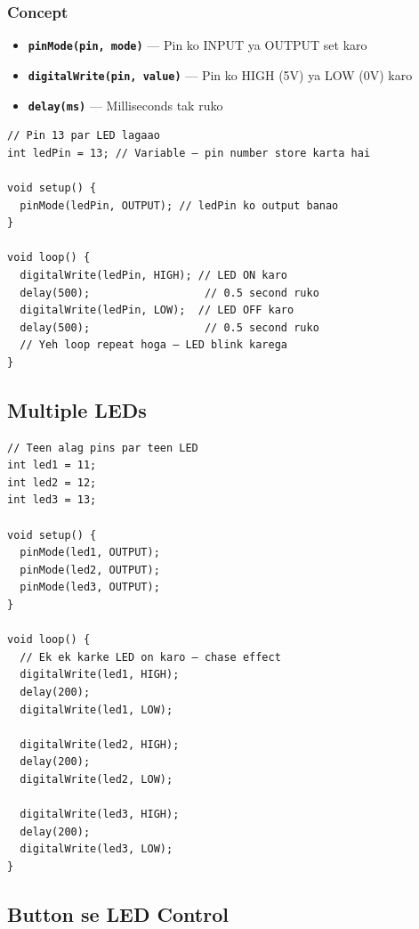 \documentclass[12pt,a4paper]{article}
\newcommand{\keyword}[1]{\textcolor{keywordColor}{\texttt{\textbf{#1}}}}
\begin{document}
\subsubsection{Concept}
\begin{itemize}
  \item \keyword{pinMode(pin, mode)} — Pin ko INPUT ya OUTPUT set karo
  \item \keyword{digitalWrite(pin, value)} — Pin ko HIGH (5V) ya LOW (0V) karo
  \item \keyword{delay(ms)} — Milliseconds tak ruko
\end{itemize}

\begin{tcolorbox}[codebox=Example 1: LED Blink]
\begin{lstlisting}
// Pin 13 par LED lagaao
int ledPin = 13; // Variable — pin number store karta hai

void setup() {
  pinMode(ledPin, OUTPUT); // ledPin ko output banao
}

void loop() {
  digitalWrite(ledPin, HIGH); // LED ON karo
  delay(500);                  // 0.5 second ruko
  digitalWrite(ledPin, LOW);  // LED OFF karo
  delay(500);                  // 0.5 second ruko
  // Yeh loop repeat hoga — LED blink karega
}
\end{lstlisting}
\end{tcolorbox}

\subsection{Multiple LEDs}

\begin{tcolorbox}[codebox=Example 2: Teen LED ka Chase Effect]
\begin{lstlisting}
// Teen alag pins par teen LED
int led1 = 11;
int led2 = 12;
int led3 = 13;

void setup() {
  pinMode(led1, OUTPUT);
  pinMode(led2, OUTPUT);
  pinMode(led3, OUTPUT);
}

void loop() {
  // Ek ek karke LED on karo — chase effect
  digitalWrite(led1, HIGH);
  delay(200);
  digitalWrite(led1, LOW);

  digitalWrite(led2, HIGH);
  delay(200);
  digitalWrite(led2, LOW);

  digitalWrite(led3, HIGH);
  delay(200);
  digitalWrite(led3, LOW);
}
\end{lstlisting}
\end{tcolorbox}

\subsection{Button se LED Control}
\end{document}

